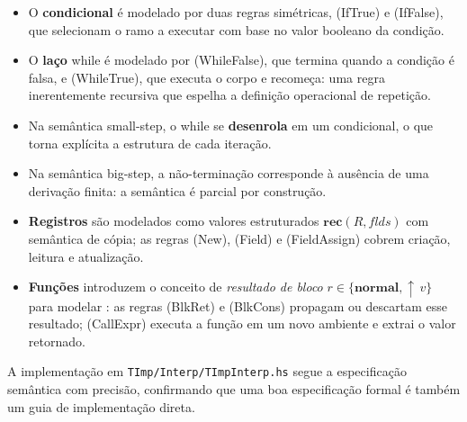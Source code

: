 \begin{itemize}
  \item
    O \textbf{condicional} é modelado por duas regras simétricas,
    (IfTrue) e (IfFalse), que selecionam o ramo a executar com base
    no valor booleano da condição.
  \item
    O \textbf{laço} while é modelado por
    (WhileFalse), que termina quando a condição é falsa, e
    (WhileTrue), que executa o corpo e recomeça: uma regra
    inerentemente recursiva que espelha a definição operacional
    de repetição.
  \item
    Na semântica small-step, o while se
    \textbf{desenrola} em um condicional, o que torna explícita a
    estrutura de cada iteração.
  \item
    Na semântica big-step, a não-terminação corresponde à ausência de
    uma derivação finita: a semântica é parcial por construção.
  \item
    \textbf{Registros} são modelados como valores estruturados
    \(\mathbf{rec}(R, \mathit{flds})\) com semântica de cópia; as regras
    (New), (Field) e (FieldAssign) cobrem criação, leitura e atualização.
  \item
    \textbf{Funções} introduzem o conceito de \textit{resultado de bloco}
    \(r \in \{\mathbf{normal}, {\uparrow}\,v\}\) para modelar
    : as regras (BlkRet) e (BlkCons) propagam ou
    descartam esse resultado; (CallExpr) executa a função em um novo ambiente
    e extrai o valor retornado.
\end{itemize}

A implementação em \verb|TImp/Interp/TImpInterp.hs| segue a
especificação semântica com precisão, confirmando que uma boa
especificação formal é também um guia de implementação direta.
